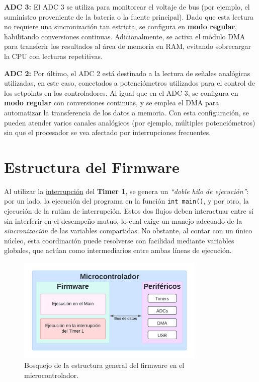 \documentclass[11pt]{report}
\begin{document}
\textbf{ADC 3:} El ADC 3 se utiliza para monitorear el voltaje de bus (por ejemplo, el suministro proveniente de la batería o la fuente principal). Dado que esta lectura no requiere una sincronización tan estricta, se configura en \textbf{modo regular}, habilitando conversiones continuas. Adicionalmente, se activa el módulo DMA para transferir los resultados al área de memoria en RAM, evitando sobrecargar la CPU con lecturas repetitivas.

\textbf{ADC 2:} Por último, el ADC 2 está destinado a la lectura de señales analógicas utilizadas, en este caso, conectados a potenciómetros utilizados para el control de los setpoints en los controladores. Al igual que en el ADC 3, se configura en \textbf{modo regular} con conversiones continuas, y se emplea el DMA para automatizar la transferencia de los datos a memoria. Con esta configuración, se pueden atender varios canales analógicos (por ejemplo, múltiples potenciómetros) sin que el procesador se vea afectado por interrupciones frecuentes.

\section{Estructura del Firmware}

Al utilizar la \href{https://www.youtube.com/watch?v=poa_QBvtIBA}{interrupción} del \textbf{Timer 1}, se genera un \emph{“doble hilo de ejecución”}: por un lado, la ejecución del programa en la función \texttt{int main()}, y por otro, la ejecución de la rutina de interrupción. Estos dos flujos deben interactuar entre sí sin interferir en el desempeño mutuo, lo cual exige un manejo adecuado de la \emph{sincronización} de las variables compartidas. No obstante, al contar con un único núcleo, esta coordinación puede resolverse con facilidad mediante variables globales, que actúan como intermediarios entre ambas líneas de ejecución.

\begin{figure}[ht]
	\centering
	\includegraphics[width=0.8\textwidth]{imagenes/Diagramas/lineas de ejecucion.png}
	\caption{Bosquejo de la estructura general del firmware en el microcontrolador.}
	\label{firmware_microcontrolador}
\end{figure}
\FloatBarrier
\end{document}
